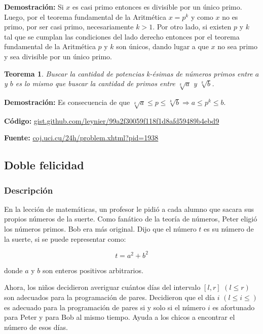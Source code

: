\documentclass[12pt]{article}
\newcommand{\proof}{\textbf{Demostración:} }
\newcommand{\nl}{\vspace{0.3cm}}
\newtheorem{theorem}{Teorema}
\begin{document}
\proof Si $x$ es casi primo entonces es divisible por un único primo. Luego, por el teorema fundamental de la Aritmética $x = p^k$ y como $x$ no es primo, por ser casi primo, necesariamente $k > 1$. Por otro lado, si existen $p$ y $k$ tal que se cumplan las condiciones del lado derecho entonces por el teorema fundamental de la Aritmética $p$ y $k$ son únicos, dando lugar a que $x$ no sea primo y sea divisible por un único primo.

\begin{theorem}
	Buscar la cantidad de potencias k-ésimas de números primos entre $a$ y $b$ es lo mismo que buscar la cantidad de primos entre $\sqrt[k]{a}$ y $\sqrt[k]{b}$.
\end{theorem}

\proof Es consecuencia de que $\sqrt[k]{a} \leqslant p \leqslant \sqrt[k]{b} \Rightarrow a \leqslant p^k \leqslant b$.

\nl

\textbf{Código:} \href{https://gist.github.com/leynier/99a2f30059f118f1d8afd59489b4ebd9}{gist.github.com/leynier/99a2f30059f118f1d8afd59489b4ebd9}

\nl

\textbf{Fuente:} \href{http://coj.uci.cu/24h/problem.xhtml?pid=1938}{coj.uci.cu/24h/problem.xhtml?pid=1938}
 
\subsection{Doble felicidad}

\subsubsection{Descripción}

En la lección de matemáticas, un profesor le pidió a cada alumno que sacara sus propios números de la suerte. Como fanático de la teoría de números, Peter eligió los números primos. Bob era más original. Dijo que el número $t$ es su número de la suerte, si se puede representar como:

$$ t = a^2 + b^2 $$

donde $a$ y $b$ son enteros positivos arbitrarios.

\nl

Ahora, los niños decidieron averiguar cuántos días del intervalo $[l, r]$ $(l \leqslant r)$ son adecuados para la programación de pares. Decidieron que el día $i$ $(l \leqslant i \leqslant)$ es adecuado para la programación de pares si y solo si el número $i$ es afortunado para Peter y para Bob al mismo tiempo. Ayuda a los chicos a encontrar el número de esos días.
\end{document}
